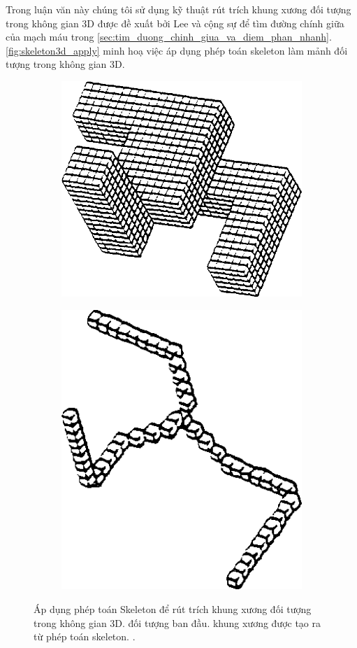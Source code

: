 	Trong luận văn này chúng tôi sử dụng kỹ thuật rút trích khung xương đối tượng trong không gian 3D được đề xuất bởi Lee và cộng sự \cite{lee1994building} để tìm đường chính giữa của mạch máu trong \autoref{sec:tim_duong_chinh_giua_va_diem_phan_nhanh}. \autoref{fig:skeleton3d_apply} minh hoạ việc áp dụng phép toán skeleton làm mảnh đối tượng trong không gian 3D.
	\begin{figure}[h!]
		\centering
		\begin{subfigure}[b]{0.49\textwidth}
			\centering
			\includegraphics[width=.8\textwidth]{figures/morphology_skeleton3d_before}
			\caption{}
			\label{fig:skeleton3d_apply_before}
		\end{subfigure}
		\hfill
		\begin{subfigure}[b]{0.49\textwidth}
			\centering
			\includegraphics[width=.6\textwidth]{figures/morphology_skeleton3d_after}
			\caption{}
			\label{fig:skeleton3d_apply_after}
		\end{subfigure}%
		\caption[Áp dụng phép toán Skeleton để rút trích khung xương đối tượng trong không gian 3D.]{Áp dụng phép toán Skeleton để rút trích khung xương đối tượng trong không gian 3D.  đối tượng ban đầu.  khung xương được tạo ra từ phép toán skeleton. .}
		\label{fig:skeleton3d_apply}
	\end{figure}

